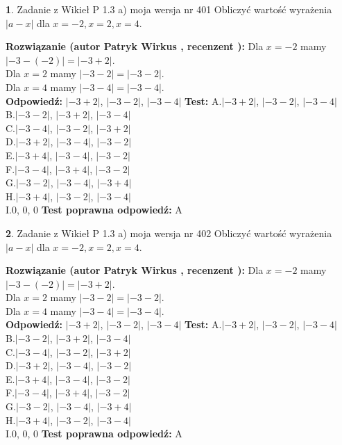\documentclass[12pt, a4paper]{article}
\theoremstyle{definition} %
\newtheorem{zad}{}
\newcommand{\zadStart}[1]{\begin{zad}#1\newline}
\newcommand{\zadStop}{\end{zad}}
\newcommand{\rozwStart}[2]{\noindent \textbf{Rozwiązanie (autor #1 , recenzent #2): }\newline}
\newcommand{\rozwStop}{\newline}
\newcommand{\odpStart}{\noindent \textbf{Odpowiedź:}\newline}
\newcommand{\odpStop}{\newline}
\newcommand{\testStart}{\noindent \textbf{Test:}\newline}
\newcommand{\testStop}{\newline}
\newcommand{\kluczStart}{\noindent \textbf{Test poprawna odpowiedź:}\newline}
\newcommand{\kluczStop}{\newline}
\begin{document}
\zadStart{Zadanie z Wikieł P 1.3 a) moja wersja nr 401}
Obliczyć wartość wyrażenia $|a - x|$ dla $x=-2,x=2,x=4$.
\zadStop
\rozwStart{Patryk Wirkus}{}
Dla $x = -2$ mamy $|-3 - (-2)| = |-3 + 2|$.\\
Dla $x = 2$ mamy $|-3 - 2| = |-3 - 2|$.\\
Dla $x = 4$ mamy $|-3 - 4| = |-3 - 4|$.\\
\rozwStop
\odpStart
$|-3 + 2|$, $|-3 - 2|$, $|-3 - 4|$
\odpStop
\testStart
A.$|-3 + 2|$, $|-3 - 2|$, $|-3 - 4|$\\
B.$|-3 - 2|$, $|-3 + 2|$, $|-3 - 4|$\\
C.$|-3 - 4|$, $|-3 - 2|$, $|-3 + 2|$\\
D.$|-3 + 2|$, $|-3 - 4|$, $|-3 - 2|$\\
E.$|-3 + 4|$, $|-3 - 4|$, $|-3 - 2|$\\
F.$|-3 - 4|$, $|-3 + 4|$, $|-3 - 2|$\\
G.$|-3 - 2|$, $|-3 - 4|$, $|-3 + 4|$\\
H.$|-3 + 4|$, $|-3 - 2|$, $|-3 - 4|$\\
I.$0$, $0$, $0$
\testStop
\kluczStart
A
\kluczStop



\zadStart{Zadanie z Wikieł P 1.3 a) moja wersja nr 402}
Obliczyć wartość wyrażenia $|a - x|$ dla $x=-2,x=2,x=4$.
\zadStop
\rozwStart{Patryk Wirkus}{}
Dla $x = -2$ mamy $|-3 - (-2)| = |-3 + 2|$.\\
Dla $x = 2$ mamy $|-3 - 2| = |-3 - 2|$.\\
Dla $x = 4$ mamy $|-3 - 4| = |-3 - 4|$.\\
\rozwStop
\odpStart
$|-3 + 2|$, $|-3 - 2|$, $|-3 - 4|$
\odpStop
\testStart
A.$|-3 + 2|$, $|-3 - 2|$, $|-3 - 4|$\\
B.$|-3 - 2|$, $|-3 + 2|$, $|-3 - 4|$\\
C.$|-3 - 4|$, $|-3 - 2|$, $|-3 + 2|$\\
D.$|-3 + 2|$, $|-3 - 4|$, $|-3 - 2|$\\
E.$|-3 + 4|$, $|-3 - 4|$, $|-3 - 2|$\\
F.$|-3 - 4|$, $|-3 + 4|$, $|-3 - 2|$\\
G.$|-3 - 2|$, $|-3 - 4|$, $|-3 + 4|$\\
H.$|-3 + 4|$, $|-3 - 2|$, $|-3 - 4|$\\
I.$0$, $0$, $0$
\testStop
\kluczStart
A
\kluczStop
\end{document}
